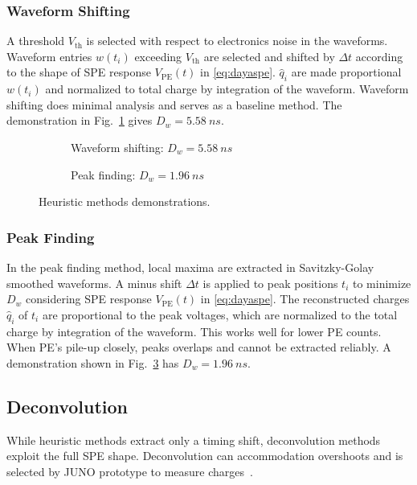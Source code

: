 \subsubsection{Waveform Shifting}
\label{sec:shifting}
A threshold $V_\mathrm{th}$ is selected with respect to electronics noise in the waveforms. Waveform entries $w(t_i)$ exceeding $V_\mathrm{th}$ are selected and shifted by $\Delta t$ according to the shape of SPE response $V_\mathrm{PE}(t)$ in \eqref{eq:dayaspe}. $\hat{q}_i$ are made proportional $w(t_i)$ and normalized to total charge by integration of the waveform.  Waveform shifting does minimal analysis and serves as a baseline method.  The demonstration in Fig.~\ref{fig:shifting} gives $D_w = \SI{5.58}{ns}$.

\begin{figure}[H]
  \begin{subfigure}{0.5\textwidth}
    \centering
    \scalebox{0.36}{}
    \caption{\label{fig:shifting}Waveform shifting: $D_w = \SI{5.58}{ns}$}
  \end{subfigure}
  \begin{subfigure}{0.5\textwidth}
    \centering
    \scalebox{0.36}{}
    \caption{\label{fig:peak}Peak finding: $D_w = \SI{1.96}{ns}$}
  \end{subfigure}
  \caption{Heuristic methods demonstrations.}
\end{figure}

\subsubsection{Peak Finding}
\label{sec:findpeak}

In the peak finding method, local maxima are extracted in Savitzky-Golay smoothed waveforms.  A minus shift $\Delta t$ is applied to peak positions $t_i$ to minimize $D_w$ considering SPE response $V_\mathrm{PE}(t)$ in \eqref{eq:dayaspe}. The reconstructed charges $\hat{q}_i$ of $t_i$ are proportional to the peak voltages, which are normalized to the total charge by integration of the waveform.  This works well for lower PE counts. When PE's pile-up closely, peaks overlaps and cannot be extracted reliably. A demonstration shown in Fig.~\ref{fig:peak} has $D_w = \SI{1.96}{ns}$. 

\subsection{Deconvolution}
While heuristic methods extract only a timing shift, deconvolution methods exploit the full SPE shape.  Deconvolution can accommodation overshoots and is selected by JUNO prototype to measure charges~\cite{zhang_comparison_2019}.

